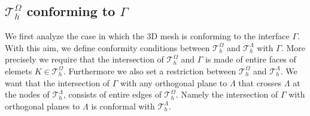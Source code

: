 \subsection{$\mathcal{T}^{\Omega}_h$ conforming to $\Gamma$}
 We first analyze the case in which the 3D mesh is conforming to the interface $\Gamma$. With this aim, we define conformity conditions between $\mathcal{T}^{\Omega}_h$ and $\mathcal{T}^{\Lambda}_h$ with $\Gamma$. More precisely we require that the intersection of $\mathcal{T}^{\Omega}_h$ and $\Gamma$ is made of entire faces of elemets $K \in \mathcal{T}^{\Omega}_h$. Furthermore we also set a restriction between $\mathcal{T}^{\Omega}_h$ and $\mathcal{T}^{\Lambda}_h$. We want that the intersection of $\Gamma$ with any orthogonal plane to $\Lambda$ that crosses $\Lambda$ at the nodes of $\mathcal{T}^{\Lambda}_h$, consists of entire edges of $\mathcal{T}^{\Omega}_h$. Namely the intersection of $\Gamma$ with orthogonal planes to $\Lambda$ is conformal with $\mathcal{T}^{\Lambda}_h$.
